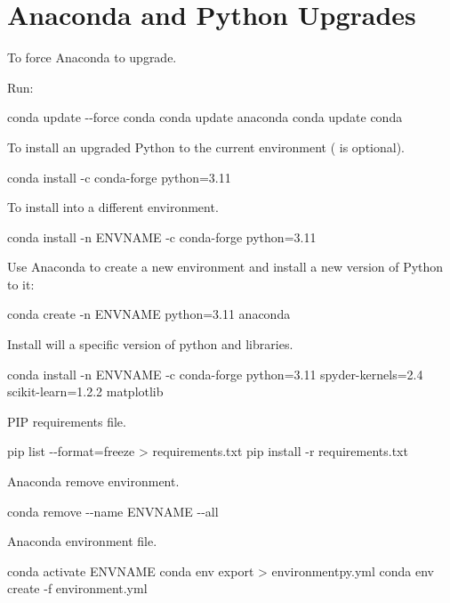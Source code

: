 	\section{Anaconda and Python Upgrades}
	\begin{numberedlist}
		\item To force Anaconda to upgrade.
		\item Run:
		\begin{code}[\codenumbering]{}
			\codeitemnonumber conda update -{}-force conda
			\codeitemnonumber conda update anaconda
			\codeitemnonumber conda update conda
		\end{code}
		\item To install an upgraded Python to the current environment ( is optional).
		\begin{code}[\codenumbering]{}
			\codeitemnonumber conda install -c conda-forge python=3.11
		\end{code}
		\item To install into a different environment.
		\begin{code}[\codenumbering]{}
			\codeitemnonumber conda install -n ENVNAME -c conda-forge python=3.11
		\end{code}
		\item \important{[PREFERRED]} Use Anaconda to create a new environment and install a new version of Python to it:
		\begin{code}[\codenumbering]{}
			\codeitemnonumber conda create -n ENVNAME python=3.11 anaconda
		\end{code}
		\item Install will a specific version of python and libraries.
		\begin{code}[\codenumbering]{}
			\codeitemnonumber conda install -n ENVNAME -c conda-forge python=3.11 spyder-kernels=2.4 scikit-learn=1.2.2 matplotlib
		\end{code}

		\item PIP requirements file.
		\begin{code}[\codenumbering]{}
			\codeitemnonumber pip list -{}-format=freeze > requirements.txt
			\codeitemnonumber pip install -r requirements.txt
		\end{code}

		\item Anaconda remove environment.
		\begin{code}[\codenumbering]{}
			\codeitemnonumber conda remove -{}-name ENVNAME -{}-all
		\end{code}

		\item Anaconda environment file.
		\begin{code}[\codenumbering]{}
			\codeitemnonumber conda activate ENVNAME
			\codeitemnonumber conda env export > environmentpy.yml
			\codeitemnonumber conda env create -f environment.yml
		\end{code}


	\end{numberedlist}
